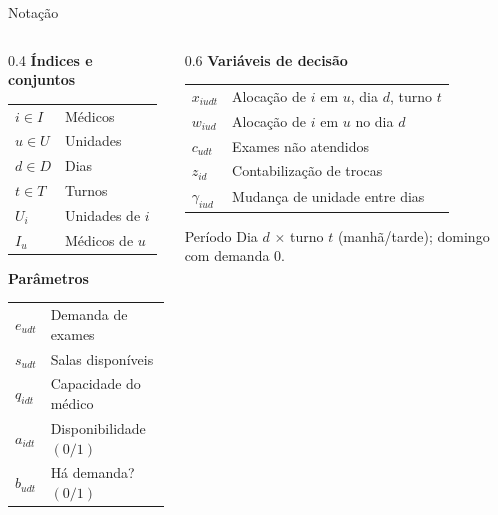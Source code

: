 \begin{frame}{Notação}
    \begin{small}
        \begin{columns}[T]
            \begin{column}{0.4\textwidth}
                \textbf{Índices e conjuntos}
                \begin{tabular}{ll}
                    \(i \in I\) & Médicos \\
                    \(u \in U\) & Unidades \\
                    \(d \in D\) & Dias \\
                    \(t \in T\) & Turnos \\
                    \(U_i\)     & Unidades de \(i\) \\
                    \(I_u\)     & Médicos de \(u\) \\
                \end{tabular}

                \vspace{0.4em}
                \textbf{Parâmetros}
                \begin{tabular}{ll}
                    \(e_{udt}\) & Demanda de exames \\
                    \(s_{udt}\) & Salas disponíveis \\
                    \(q_{idt}\) & Capacidade do médico \\
                    \(a_{idt}\) & Disponibilidade \((0/1)\) \\
                    \(b_{udt}\) & Há demanda? \((0/1)\) \\
                \end{tabular}
            \end{column}
            \begin{column}{0.6\textwidth}
                \textbf{Variáveis de decisão}
                \begin{tabular}{ll}
                    \(x_{iudt}\) & Alocação de \(i\) em \(u\), dia \(d\), turno \(t\) \\
                    \(w_{iud}\)  & Alocação de \(i\) em \(u\) no dia \(d\) \\
                    \(c_{udt}\)  & Exames não atendidos \\
                    \(z_{id}\)   & Contabilização de trocas \\
                    \(\gamma_{iud}\) & Mudança de unidade entre dias \\
                \end{tabular}

                \vspace{0.8em}
                \begin{block}{Período}
                    Dia \(d\) \(\times\) turno \(t\) (manhã/tarde); domingo com demanda \(0\).
                \end{block}
            \end{column}
        \end{columns}
    \end{small}
\end{frame}

